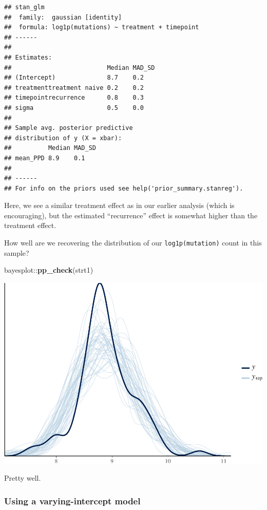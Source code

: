 \documentclass[]{article}
\newenvironment{Shaded}{\begin{snugshade}}{\end{snugshade}}
\newcommand{\KeywordTok}[1]{\textcolor[rgb]{0.13,0.29,0.53}{\textbf{{#1}}}}
\newcommand{\NormalTok}[1]{{#1}}
\begin{document}
\begin{verbatim}
## stan_glm
##  family:  gaussian [identity]
##  formula: log1p(mutations) ~ treatment + timepoint
## ------
## 
## Estimates:
##                          Median MAD_SD
## (Intercept)              8.7    0.2   
## treatmenttreatment naive 0.2    0.2   
## timepointrecurrence      0.8    0.3   
## sigma                    0.5    0.0   
## 
## Sample avg. posterior predictive 
## distribution of y (X = xbar):
##          Median MAD_SD
## mean_PPD 8.9    0.1   
## 
## ------
## For info on the priors used see help('prior_summary.stanreg').
\end{verbatim}

Here, we see a similar treatment effect as in our earlier analysis
(which is encouraging), but the estimated ``recurrence'' effect is
somewhat higher than the treatment effect.

How well are we recovering the distribution of our
\texttt{log1p(mutation)} count in this sample?

\begin{Shaded}
\begin{Highlighting}[]
\NormalTok{bayesplot::}\KeywordTok{pp_check}\NormalTok{(strt1)}
\end{Highlighting}
\end{Shaded}

\includegraphics{Hierarchical_model_mutations_and_peptides_files/figure-latex/allsolid-strt1-ppcheck-1.pdf}

Pretty well.

\subsubsection{Using a varying-intercept
model}\label{using-a-varying-intercept-model}
\end{document}
